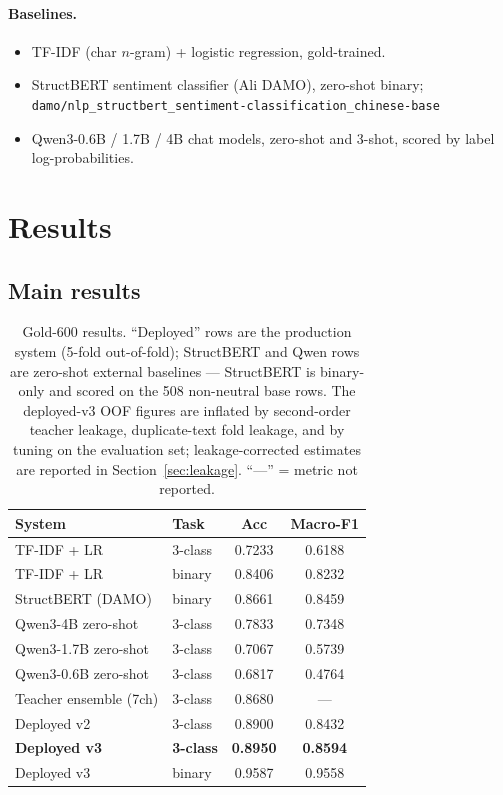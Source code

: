 \documentclass[11pt,a4paper]{article}
\newcommand{\code}[1]{\texttt{#1}}
\begin{document}
\paragraph{Baselines.}
\begin{itemize}
  \item TF-IDF (char $n$-gram) + logistic regression, gold-trained.
  \item StructBERT sentiment classifier (Ali DAMO), zero-shot binary;\\
        \footnotesize\code{damo/nlp\_structbert\_sentiment-classification\_chinese-base}
  \item Qwen3-0.6B / 1.7B / 4B chat models, zero-shot and 3-shot,
        scored by label log-probabilities.
\end{itemize}

\section{Results}
\label{sec:results}

\subsection{Main results}

\begin{table}[H]
\centering\small
\caption{Gold-600 results. ``Deployed'' rows are the production system
(5-fold out-of-fold); StructBERT and Qwen rows are zero-shot external
baselines --- StructBERT is binary-only and scored on the 508
non-neutral base rows. The deployed-v3 OOF figures are inflated by
second-order teacher leakage, duplicate-text fold leakage, and by
tuning on the evaluation set;
leakage-corrected estimates are reported in
Section~\ref{sec:leakage}. ``---'' = metric not reported.}
\label{tab:main}
\begin{tabular}{llcc}
\toprule
System & Task & Acc & Macro-F1 \\
\midrule
TF-IDF + LR            & 3-class & 0.7233 & 0.6188 \\
TF-IDF + LR            & binary  & 0.8406 & 0.8232 \\
StructBERT (DAMO)      & binary  & 0.8661 & 0.8459 \\
Qwen3-4B zero-shot     & 3-class & 0.7833 & 0.7348 \\
Qwen3-1.7B zero-shot   & 3-class & 0.7067 & 0.5739 \\
Qwen3-0.6B zero-shot   & 3-class & 0.6817 & 0.4764 \\
Teacher ensemble (7ch) & 3-class & 0.8680 & ---    \\
Deployed v2            & 3-class & 0.8900 & 0.8432 \\
\textbf{Deployed v3}   & \textbf{3-class} & \textbf{0.8950} & \textbf{0.8594} \\
Deployed v3            & binary  & 0.9587 & 0.9558 \\
\bottomrule
\end{tabular}
\end{table}
\end{document}
